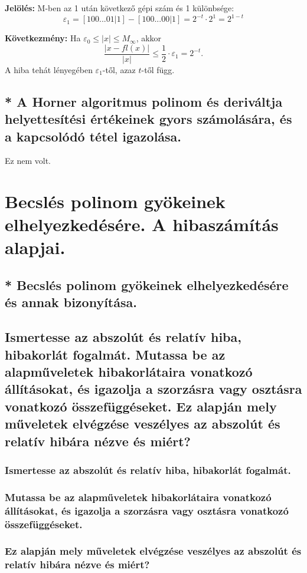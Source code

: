 \documentclass{article}
\newcommand{\jelol}{\textbf{Jelölés:} \quad}
\newcommand{\kovet}{\textbf{Következmény:} \quad}
\begin{document}
        \jelol M-ben az 1 után következő gépi szám és 1 különbsége: \[ \varepsilon_1 = [100...01|1]-[100...00|1] = 2^{-t}\cdot2^{1} = 2^{1-t} \]

        \kovet Ha $\varepsilon_0 \leq |x| \leq M_\infty$, akkor
        \[
            \frac{|x-fl(x)|}{|x|} \leq \frac{1}{2}\cdot\varepsilon_1 = 2^{-t}.
        \]
        A hiba tehát lényegében $\varepsilon_1$-től, azaz $t$-től függ.

        \subsection{* A Horner algoritmus polinom és deriváltja helyettesítési értékeinek gyors számolására, és a kapcsolódó tétel igazolása.}
            Ez nem volt.

    \section{Becslés polinom gyökeinek elhelyezkedésére. A hibaszámítás alapjai.}
        \subsection{* Becslés polinom gyökeinek elhelyezkedésére és annak bizonyítása.}
        \subsection{Ismertesse az abszolút és relatív hiba, hibakorlát fogalmát. Mutassa be az alapműveletek hibakorlátaira vonatkozó állításokat, és igazolja a szorzásra vagy osztásra vonatkozó összefüggéseket. Ez alapján mely műveletek elvégzése veszélyes az abszolút és relatív hibára nézve és miért?}
            \subsubsection{Ismertesse az abszolút és relatív hiba, hibakorlát fogalmát.}
            \subsubsection{Mutassa be az alapműveletek hibakorlátaira vonatkozó állításokat, és igazolja a szorzásra vagy osztásra vonatkozó összefüggéseket.}
            \subsubsection{Ez alapján mely műveletek elvégzése veszélyes az abszolút és relatív hibára nézve és miért?}
\end{document}
